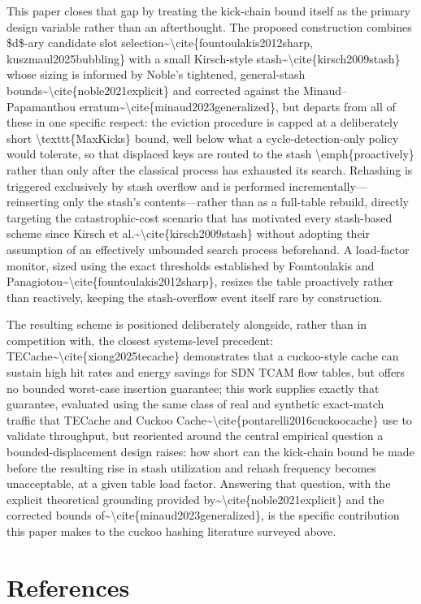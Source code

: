 \documentclass[conference]{IEEEtran}
\begin{document}
This paper closes that gap by treating the kick-chain bound itself as the primary design variable rather than an afterthought. The proposed construction combines \$d\$-ary candidate slot selection\~{}\textbackslash{}cite\{fountoulakis2012sharp, kuszmaul2025bubbling\} with a small Kirsch-style stash\~{}\textbackslash{}cite\{kirsch2009stash\} whose sizing is informed by Noble's tightened, general-stash bounds\~{}\textbackslash{}cite\{noble2021explicit\} and corrected against the Minaud--Papamanthou erratum\~{}\textbackslash{}cite\{minaud2023generalized\}, but departs from all of these in one specific respect: the eviction procedure is capped at a deliberately short \textbackslash{}texttt\{MaxKicks\} bound, well below what a cycle-detection-only policy would tolerate, so that displaced keys are routed to the stash \textbackslash{}emph\{proactively\} rather than only after the classical process has exhausted its search. Rehashing is triggered exclusively by stash overflow and is performed incrementally---reinserting only the stash's contents---rather than as a full-table rebuild, directly targeting the catastrophic-cost scenario that has motivated every stash-based scheme since Kirsch et al.\~{}\textbackslash{}cite\{kirsch2009stash\} without adopting their assumption of an effectively unbounded search process beforehand. A load-factor monitor, sized using the exact thresholds established by Fountoulakis and Panagiotou\~{}\textbackslash{}cite\{fountoulakis2012sharp\}, resizes the table proactively rather than reactively, keeping the stash-overflow event itself rare by construction.

The resulting scheme is positioned deliberately alongside, rather than in competition with, the closest systems-level precedent: TECache\~{}\textbackslash{}cite\{xiong2025tecache\} demonstrates that a cuckoo-style cache can sustain high hit rates and energy savings for SDN TCAM flow tables, but offers no bounded worst-case insertion guarantee; this work supplies exactly that guarantee, evaluated using the same class of real and synthetic exact-match traffic that TECache and Cuckoo Cache\~{}\textbackslash{}cite\{pontarelli2016cuckoocache\} use to validate throughput, but reoriented around the central empirical question a bounded-displacement design raises: how short can the kick-chain bound be made before the resulting rise in stash utilization and rehash frequency becomes unacceptable, at a given table load factor. Answering that question, with the explicit theoretical grounding provided by\~{}\textbackslash{}cite\{noble2021explicit\} and the corrected bounds of\~{}\textbackslash{}cite\{minaud2023generalized\}, is the specific contribution this paper makes to the cuckoo hashing literature surveyed above.

\section{References}


\end{document}
